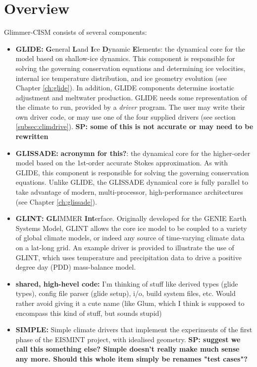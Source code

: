 \section{Overview}
%
Glimmer-CISM consists of several components:
%
\begin{itemize}
\item {\bf GLIDE:} {\bf G}eneral {\bf L}and {\bf I}ce {\bf D}ynamic {\bf E}lements: the dynamical core for the model based on shallow-ice dynamics. This component is responsible for solving the governing conservation equations and determining ice velocities, internal ice temperature distribution, and ice geometry evolution (see Chapter \ref{ch:glide}). In addition, GLIDE components determine isostatic adjustment and meltwater production. GLIDE needs some representation of the climate to run, provided by a {\it driver} program. The user may write their own driver code, or may use one of the four supplied drivers (see section \ref{subsec:climdrive}). \textbf{SP: some of this is not accurate or may need to be rewritten}
\item {\bf GLISSADE:} {\bf acronymn for this?}: the dynamical core for the higher-order model based on the 1st-order accurate Stokes approximation. As with GLIDE, this component is responsible for solving the governing conservation equations. Unlike GLIDE, the GLISSADE dynamical core is fully parallel to take advantage of modern, multi-processor, high-performance architectures  (see Chapter \ref{ch:glissade}).
\item {\bf GLINT:} {\bf GL}IMMER {\bf Int}erface. Originally developed for the GENIE %
Earth Systems Model, GLINT allows the core ice model to be coupled to a variety of global climate models, or indeed any source of time-varying climate data on a lat-long grid. An example driver is provided to illustrate the use of GLINT, which uses temperature and precipitation data to drive a positive degree day (PDD) mass-balance model.
\item {\bf shared, high-hevel code:} I'm thinking of stuff like derived types (glide types), config file parser (glide setup), i/o, build system files, etc. Would rather avoid giving it a cute name (like Glum, which I think is supposed to encompass this kind of stuff, but sounds stupid)
\item {\bf SIMPLE:} Simple climate drivers that implement the experiments of the first phase of the EISMINT project, with idealised geometry. \textbf{SP: suggest we call this something else? Simple doesn't really make much sense any more. Should this whole item simply be renames "test cases"?}

\end{itemize}

